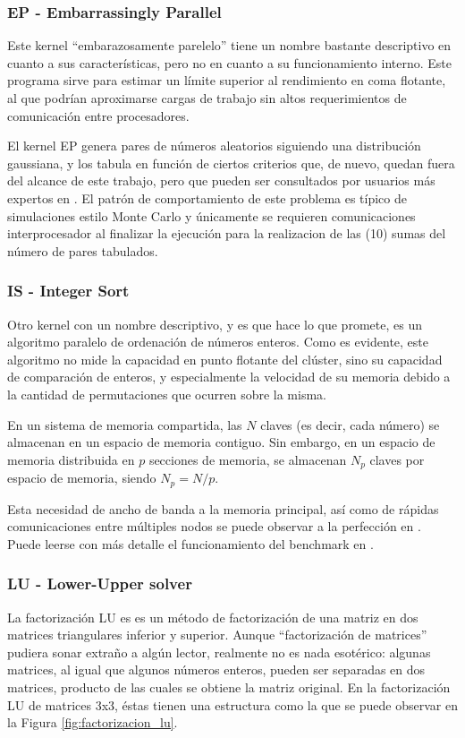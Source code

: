 \subsubsection{EP - Embarrassingly Parallel}
\label{sssec:benchmarks__ep}
Este kernel ``embarazosamente parelelo'' tiene un nombre bastante descriptivo en cuanto a sus características, pero no en cuanto a su funcionamiento interno. Este programa sirve para estimar un límite superior al rendimiento en coma flotante, al que podrían aproximarse cargas de trabajo sin altos requerimientos de comunicación entre procesadores.

El kernel EP genera pares de números aleatorios siguiendo una distribución gaussiana, y los tabula en función de ciertos criterios que, de nuevo, quedan fuera del alcance de este trabajo, pero que pueden ser consultados por usuarios más expertos en \cite[2.2.1]{benchmarks1994technical}. El patrón de comportamiento de este problema es típico de simulaciones estilo Monte Carlo y únicamente se requieren comunicaciones interprocesador al finalizar la ejecución para la realizacion de las (10) sumas del número de pares tabulados. 

\subsubsection{IS - Integer Sort}
\label{sssec:benchmarks__is}
Otro kernel con un nombre descriptivo, y es que hace lo que promete, es un algoritmo paralelo de ordenación de números enteros. Como es evidente, este algoritmo no mide la capacidad en punto flotante del clúster, sino su capacidad de comparación de enteros, y especialmente la velocidad de su memoria debido a la cantidad de permutaciones que ocurren sobre la misma.

En un sistema de memoria compartida, las $N$ claves (es decir, cada número) se almacenan en un espacio de memoria contiguo. Sin embargo, en un espacio de memoria distribuida en $p$ secciones de memoria, se almacenan $N_{p}$ claves por espacio de memoria, siendo $N_{p} = N / p$.

Esta necesidad de ancho de banda a la memoria principal, así como de rápidas comunicaciones entre múltiples nodos se puede observar a la perfección en . Puede leerse con más detalle el funcionamiento del benchmark en \cite[2.2.5]{benchmarks1994technical}.

\subsubsection{LU - Lower-Upper solver}
\label{sssec:benchmarks__lu}
La factorización LU es es un método de factorización de una matriz en dos matrices triangulares inferior y superior. Aunque ``factorización de matrices'' pudiera sonar extraño a algún lector, realmente no es nada esotérico: algunas matrices, al igual que algunos números enteros, pueden ser separadas en dos matrices, producto de las cuales se obtiene la matriz original. En la factorización LU de matrices 3x3, éstas tienen una estructura como la que se puede observar en la Figura \ref{fig:factorizacion_lu}.

